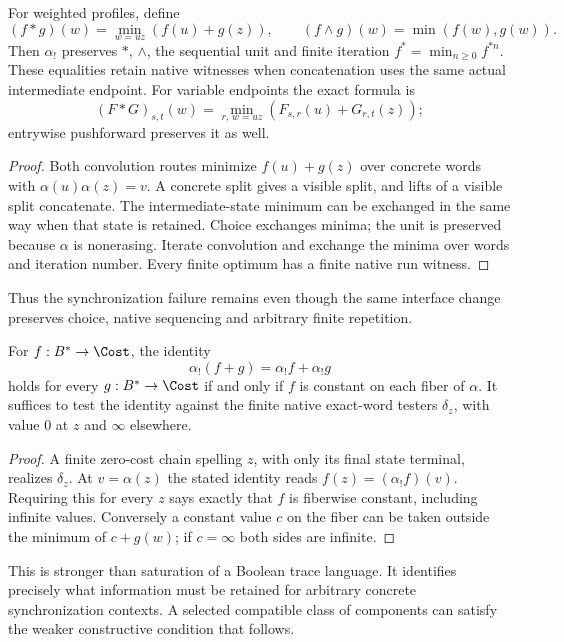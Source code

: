 \begin{proposition}
For weighted profiles, define
\[
 (f*g)(w)=\min_{w=uz}(f(u)+g(z)),\qquad
 (f\wedge g)(w)=\min(f(w),g(w)).
\]
Then $\alpha_!$ preserves $*$, $\wedge$, the sequential unit and
finite iteration $f^*=\min_{n\geq0}f^{*n}$.
These equalities retain native witnesses when concatenation uses the same
actual intermediate endpoint. For variable endpoints the exact formula is
\[
 (F*G)_{s,t}(w)=\min_{r,\,w=uz}
                      (F_{s,r}(u)+G_{r,t}(z));
\]
entrywise pushforward preserves it as well.
\end{proposition}
\begin{proof}
Both convolution routes minimize $f(u)+g(z)$ over concrete words with
$\alpha(u)\alpha(z)=v$. A concrete split gives a visible split,
and lifts of a visible split concatenate. The intermediate-state minimum
can be exchanged in the same way when that state is retained. Choice
exchanges minima; the unit is preserved because $\alpha$ is nonerasing.
Iterate convolution and exchange the minima over words and iteration
number. Every finite optimum has a finite native run witness.
\end{proof}
Thus the synchronization failure remains even though the same interface
change preserves choice, native sequencing and arbitrary finite repetition.

\begin{theorem}\label{thm:universal-native}
For $f:B^*\to\Cost$, the identity
\[
 \alpha_!(f+g)=\alpha_!f+\alpha_!g
\]
holds for every $g:B^*\to\Cost$ if and only if $f$ is constant on
each fiber of $\alpha$. It suffices to test the identity against the
finite native exact-word testers $\delta_z$, with value $0$ at $z$
and $\infty$ elsewhere.
\end{theorem}
\begin{proof}
A finite zero-cost chain spelling $z$, with only its final state terminal,
realizes $\delta_z$. At $v=\alpha(z)$ the stated identity reads
$f(z)=(\alpha_!f)(v)$. Requiring this for every $z$ says exactly that
$f$ is fiberwise constant, including infinite values. Conversely a
constant value $c$ on the fiber can be taken outside the minimum of
$c+g(w)$; if $c=\infty$ both sides are infinite.
\end{proof}
This is stronger than saturation of a Boolean trace language. It identifies
precisely what information must be retained for arbitrary concrete
synchronization contexts. A selected compatible class of components can
satisfy the weaker constructive condition that follows.

